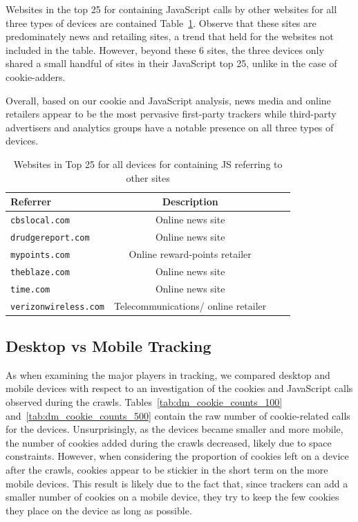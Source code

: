 \documentclass{acm_proc_article-sp}
\begin{document}
Websites in the top 25 for containing JavaScript calls by other websites for all three types of devices are contained Table~\ref{tab:major_js}. Observe that these sites are predominately news and retailing sites, a trend that held for the websites not included in the table. However, beyond these 6 sites, the three devices only shared a small handful of sites in their JavaScript top 25, unlike in the case of cookie-adders.

Overall, based on our cookie and JavaScript analysis, news media and online retailers appear to be the most pervasive first-party trackers while third-party advertisers and analytics groups have a notable presence on all three types of devices.

\begin{table}[htbp]
  \centering
  \caption{Websites in Top 25 for all devices for containing JS referring to other sites}
    \begin{tabular}{|c|c|c|c|}
    \hline
     \multicolumn{1}{|l|}{\textbf{Referrer}} & \textbf{Description}    \\ \hline
     \multicolumn{1}{|l|}{\texttt{cbslocal.com}} & Online news site   \\
    \multicolumn{1}{|l|}{\texttt{drudgereport.com}} & Online news site   \\
     \multicolumn{1}{|l|}{\texttt{mypoints.com}} & Online reward-points retailer   \\
      \multicolumn{1}{|l|}{\texttt{theblaze.com}} & Online news site   \\
       \multicolumn{1}{|l|}{\texttt{time.com}} & Online news site   \\
        \multicolumn{1}{|l|}{\texttt{verizonwireless.com}} & Telecommunications/ online retailer   \\ \hline
    \end{tabular}%
  \label{tab:major_js}%
\end{table}%

\subsection{Desktop vs Mobile Tracking}
\label{sec:desktop_vs_mobile}

As when examining the major players in tracking, we compared desktop and mobile devices with respect to an investigation of the cookies and JavaScript calls observed during the crawls. Tables~\ref{tab:dm_cookie_counts_100} and~\ref{tab:dm_cookie_counts_500} contain the raw number of cookie-related calls for the devices. Unsurprisingly, as the devices became smaller and more mobile, the number of cookies added during the crawls decreased, likely due to space constraints. However, when considering the proportion of cookies left on a device after the crawls, cookies appear to be stickier in the short term on the more mobile devices. This result is likely due to the fact that, since trackers can add a smaller number of cookies on a mobile device, they try to keep the few cookies they place on the device as long as possible.
\end{document}
